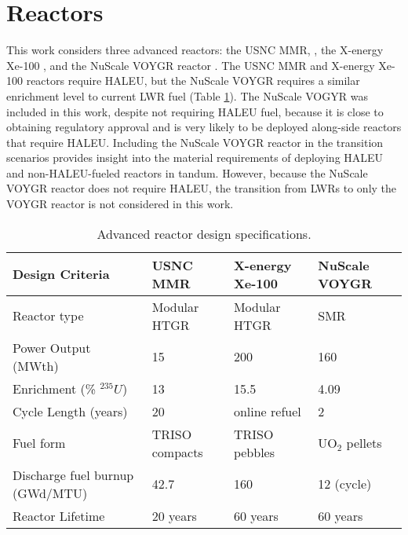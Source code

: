 \section{Reactors} \label{sec:reactor_methods}
This work considers three advanced reactors: the \gls{USNC} \gls{MMR}, 
\cite{mitchell_usnc_2020}, the X-energy Xe-100 
\cite{harlan_x-energy_2018,hussain_advances_2018}, and the NuScale VOYGR reactor
\cite{nuscale_chapter_2020,nuscale_chapter_2020-1}. The \gls{USNC} \gls{MMR}
and X-energy Xe-100 reactors require \gls{HALEU}, but the NuScale VOYGR requires
a similar enrichment level to current \gls{LWR} fuel (Table \ref{tab:reactor_summary}). 
The NuScale VOGYR was included in this work, despite not requiring \gls{HALEU} fuel, 
because it is close to obtaining regulatory approval and is very likely to be 
deployed along-side reactors that require \gls{HALEU}. Including the NuScale 
VOYGR reactor in the transition scenarios provides insight into the material 
requirements of deploying \gls{HALEU} and non-\gls{HALEU}-fueled reactors 
in tandum. However, because the NuScale VOYGR reactor does not require 
\gls{HALEU}, the transition from \glspl{LWR} to only the VOYGR reactor is 
not considered in this work.

\begin{table}[ht]
    \centering
    \caption{Advanced reactor design specifications.}
    \label{tab:reactor_summary}
    \begin{tabular}{p{5cm}p{3cm}p{3cm}p{3cm}}
        \hline
        Design Criteria & \gls{USNC} \gls{MMR} & 
            X-energy Xe-100 & NuScale VOYGR \\\hline
        Reactor type & Modular HTGR & Modular HTGR & SMR\\
        Power Output (MWth) & 15 & 200 & 160\\
        Enrichment (\% $^{235}U$) & 13 & 15.5 & 4.09\\
        Cycle Length (years) & 20 & online refuel & 2\\
        Fuel form & \gls{TRISO} compacts & \gls{TRISO} pebbles & UO$_2$ pellets\\
        Discharge fuel burnup (GWd/MTU) & 42.7& 160 & 12 (cycle) \\
        Reactor Lifetime & 20 years & 60 years & 60 years\\
        \hline
    \end{tabular}
\end{table}

